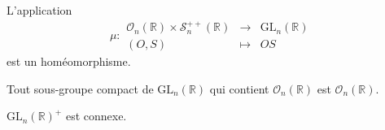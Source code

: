   
  \begin{theorem}
    L'application
    \[ \mu :
    \begin{array}{ccc}
      \mathcal{O}_n(\mathbb{R}) \times \mathcal{S}_n^{++}(\mathbb{R}) &\rightarrow& \mathrm{GL}_n(\mathbb{R}) \\
      (O, S) &\mapsto& OS
    \end{array}
    \]
    est un homéomorphisme.
  \end{theorem}
  
  \begin{corollary}
    Tout sous-groupe compact de $\mathrm{GL}_n(\mathbb{R})$ qui contient $\mathcal{O}_n(\mathbb{R})$ est $\mathcal{O}_n(\mathbb{R})$.
  \end{corollary}
  
  
  \begin{corollary}
    $\mathrm{GL}_n(\mathbb{R})^+$ est connexe.
  \end{corollary}

